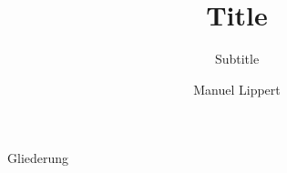 \documentclass[compress,aspectratio=1610]{beamer}
\title{Title}
\subtitle{Subtitle}
\author{Manuel Lippert}
\institute{Physik (Master of Science)}
\begin{document}
	\maketitle

	\begin{frame}{Gliederung}
		\tableofcontents[hideallsubsections]
	\end{frame}
\end{document}
